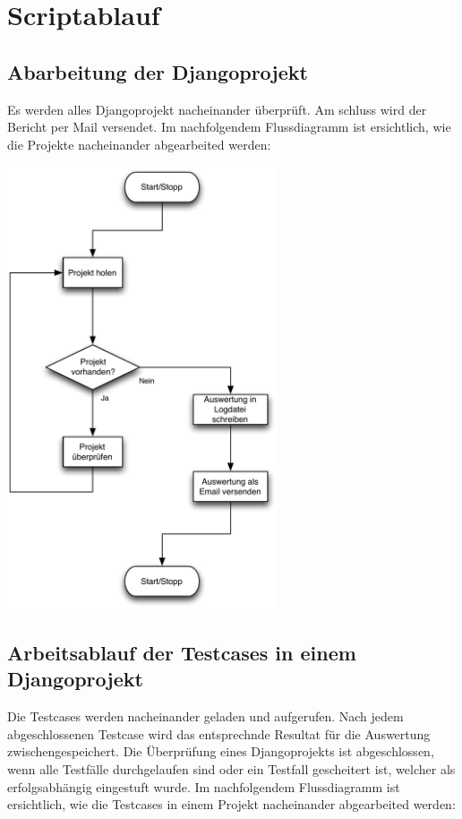 \section{Scriptablauf}
\subsection{Abarbeitung der Djangoprojekt}
Es werden alles Djangoprojekt nacheinander überprüft. Am schluss wird der Bericht per Mail versendet.
Im nachfolgendem Flussdiagramm ist ersichtlich, wie die Projekte nacheinander abgearbeited werden: \\

\begin{center}
\includegraphics[width=0.6\textwidth,angle=0]{./grafiken/pzd_projektabarbeitung.pdf}
\end{center}

\subsection{Arbeitsablauf der Testcases in einem Djangoprojekt}
Die Testcases werden nacheinander geladen und aufgerufen. Nach jedem abgeschlossenen Testcase wird das entsprechnde Resultat für die Auswertung zwischengespeichert. 
Die Überprüfung eines Djangoprojekts ist abgeschlossen, wenn alle Testfälle durchgelaufen sind oder ein Testfall gescheitert ist, welcher als erfolgsabhängig eingestuft wurde. 
Im nachfolgendem Flussdiagramm ist ersichtlich, wie die Testcases in einem Projekt nacheinander abgearbeited werden: \\ 

